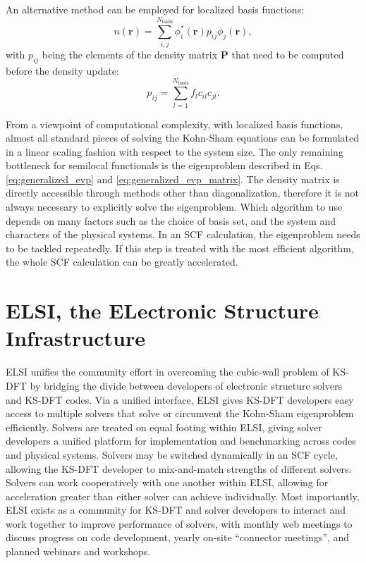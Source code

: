 \documentclass{report}
\begin{document}
An alternative method can be employed for localized basis functions:
\begin{equation}
\label{eq:density_matrix_update}
n(\boldsymbol{r}) = \sum_{i,j}^{N_\text{basis}} \phi_i^*(\boldsymbol{r}) p_{ij} \phi_j(\boldsymbol{r}) ,
\end{equation}
with $p_{ij}$ being the elements of the density matrix $\boldsymbol{P}$ that need to be computed before the density update:
\begin{equation}
\label{eq:density_matrix}
p_{ij} = \sum_{l=1}^{N_\text{basis}} f_l c_{il} c_{jl} .
\end{equation}

From a viewpoint of computational complexity, with localized basis functions, almost all standard pieces of solving the Kohn-Sham equations can be formulated in a linear scaling fashion with respect to the system size. The only remaining bottleneck for semilocal functionals is the eigenproblem described in Eqs. \ref{eq:generalized_evp} and \ref{eq:generalized_evp_matrix}. The density matrix is directly accessible through methods other than diagonalization, therefore it is not always necessary to explicitly solve the eigenproblem. Which algorithm to use depends on many factors such as the choice of basis set, and the system and characters of the physical systems. In an SCF calculation, the eigenproblem needs to be tackled repeatedly. If this step is treated with the most efficient algorithm, the whole SCF calculation can be greatly accelerated.

\section{ELSI, the ELectronic Structure Infrastructure}
\label{sec:elsi}
ELSI unifies the community effort in overcoming the cubic-wall problem of KS-DFT by bridging the divide between developers of electronic structure solvers and KS-DFT codes. Via a unified interface, ELSI gives KS-DFT developers easy access to multiple solvers that solve or circumvent the Kohn-Sham eigenproblem efficiently. Solvers are treated on equal footing within ELSI, giving solver developers a unified platform for implementation and benchmarking across codes and physical systems. Solvers may be switched dynamically in an SCF cycle, allowing the KS-DFT developer to mix-and-match strengths of different solvers. Solvers can work cooperatively with one another within ELSI, allowing for acceleration greater than either solver can achieve individually. Most importantly, ELSI exists as a community for KS-DFT and solver developers to interact and work together to improve performance of solvers, with monthly web meetings to discuss progress on code development, yearly on-site ``connector meetings'', and planned webinars and workshops.
\end{document}

